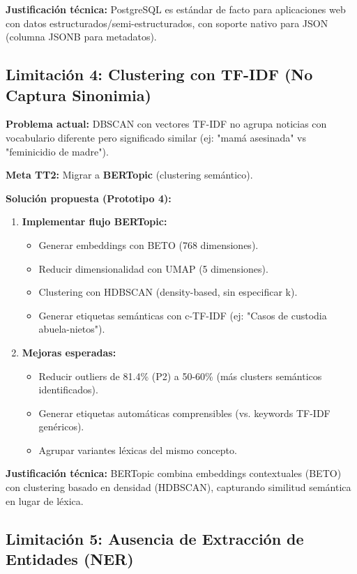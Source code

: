 \textbf{Justificación técnica:} PostgreSQL es estándar de facto para aplicaciones web con datos estructurados/semi-estructurados, con soporte nativo para JSON (columna JSONB para metadatos).

\subsection{Limitación 4: Clustering con TF-IDF (No Captura Sinonimia)}
\label{subsec:lim4_clustering}

\textbf{Problema actual:} DBSCAN con vectores TF-IDF no agrupa noticias con vocabulario diferente pero significado similar (ej: "mamá asesinada" vs "feminicidio de madre").

\textbf{Meta TT2:} Migrar a \textbf{BERTopic} (clustering semántico).

\textbf{Solución propuesta (Prototipo 4):}
\begin{enumerate}
    \item \textbf{Implementar flujo BERTopic:}
    \begin{itemize}
        \item Generar embeddings con BETO (768 dimensiones).
        \item Reducir dimensionalidad con UMAP (5 dimensiones).
        \item Clustering con HDBSCAN (density-based, sin especificar k).
        \item Generar etiquetas semánticas con c-TF-IDF (ej: "Casos de custodia abuela-nietos").
    \end{itemize}
    
    \item \textbf{Mejoras esperadas:}
    \begin{itemize}
        \item Reducir outliers de 81.4\% (P2) a 50-60\% (más clusters semánticos identificados).
        \item Generar etiquetas automáticas comprensibles (vs. keywords TF-IDF genéricos).
        \item Agrupar variantes léxicas del mismo concepto.
    \end{itemize}
\end{enumerate}

\textbf{Justificación técnica:} BERTopic combina embeddings contextuales (BETO) con clustering basado en densidad (HDBSCAN), capturando similitud semántica en lugar de léxica.

\subsection{Limitación 5: Ausencia de Extracción de Entidades (NER)}
\label{subsec:lim5_ner}

